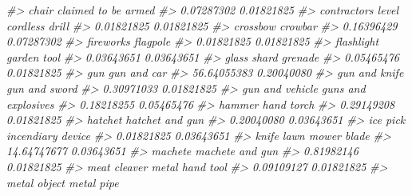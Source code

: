 \documentclass[
  12pt,
]{book}
\newenvironment{Shaded}{\begin{snugshade}}{\end{snugshade}}
\newcommand{\CommentTok}[1]{\textcolor[rgb]{0.37,0.37,0.37}{\textit{#1}}}
\begin{document}
\begin{Shaded}
\begin{Highlighting}[]
\CommentTok{\#>                            chair              claimed to be armed }
\CommentTok{\#>                       0.07287302                       0.01821825 }
\CommentTok{\#>               contractor\textquotesingle{}s level                   cordless drill }
\CommentTok{\#>                       0.01821825                       0.01821825 }
\CommentTok{\#>                         crossbow                          crowbar }
\CommentTok{\#>                       0.16396429                       0.07287302 }
\CommentTok{\#>                        fireworks                         flagpole }
\CommentTok{\#>                       0.01821825                       0.01821825 }
\CommentTok{\#>                       flashlight                      garden tool }
\CommentTok{\#>                       0.03643651                       0.03643651 }
\CommentTok{\#>                      glass shard                          grenade }
\CommentTok{\#>                       0.05465476                       0.01821825 }
\CommentTok{\#>                              gun                      gun and car }
\CommentTok{\#>                      56.64055383                       0.20040080 }
\CommentTok{\#>                    gun and knife                    gun and sword }
\CommentTok{\#>                       0.30971033                       0.01821825 }
\CommentTok{\#>                  gun and vehicle              guns and explosives }
\CommentTok{\#>                       0.18218255                       0.05465476 }
\CommentTok{\#>                           hammer                       hand torch }
\CommentTok{\#>                       0.29149208                       0.01821825 }
\CommentTok{\#>                          hatchet                  hatchet and gun }
\CommentTok{\#>                       0.20040080                       0.03643651 }
\CommentTok{\#>                         ice pick                incendiary device }
\CommentTok{\#>                       0.01821825                       0.03643651 }
\CommentTok{\#>                            knife                 lawn mower blade }
\CommentTok{\#>                      14.64747677                       0.03643651 }
\CommentTok{\#>                          machete                  machete and gun }
\CommentTok{\#>                       0.81982146                       0.01821825 }
\CommentTok{\#>                     meat cleaver                  metal hand tool }
\CommentTok{\#>                       0.09109127                       0.01821825 }
\CommentTok{\#>                     metal object                       metal pipe }

\end{Highlighting}
\end{Shaded}
\end{document}

